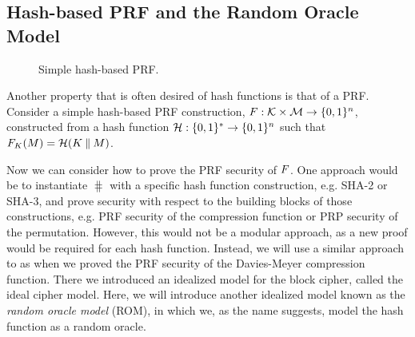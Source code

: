 \subsection{Hash-based PRF and the Random Oracle Model}

\begin{wrapfigure}{r}{2in}
  \centering
{}
\caption{Simple hash-based PRF.}
\label{fig:hash-based-prf}
\end{wrapfigure}

Another property that is often desired of hash functions is that of a PRF.
Consider a simple hash-based PRF construction, $F:{\cal K}\times{\cal M}\rightarrow\{0,1\}^{n}$, constructed from a hash function $\mathcal{H}:\{0,1\}^{*}\rightarrow\{0,1\}^{n}$ such that $F_{K}(M) = \mathcal{H}(K\: \| \:M)$.

Now we can consider how to prove the PRF security of $F$.
One approach would be to instantiate $\hash$ with a specific hash function construction, e.g. SHA-2 or SHA-3, and prove security with respect to the building blocks of those constructions, e.g. PRF security of the compression function or PRP security of the permutation.
However, this would not be a modular approach, as a new proof would be required for each hash function.
Instead, we will use a similar approach to as when we proved the PRF security of the Davies-Meyer compression function.
There we introduced an idealized model for the block cipher, called the ideal cipher model.
Here, we will introduce another idealized model known as the \emph{random oracle model} (ROM), in which we, as the name suggests, model the hash function as a random oracle.

